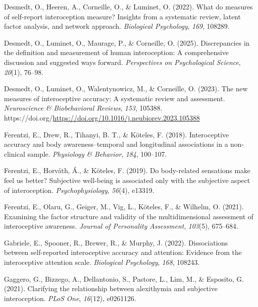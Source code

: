 \documentclass[
  jou,
  floatsintext,
  longtable,
  nolmodern,
  notxfonts,
  notimes,
  colorlinks=true,linkcolor=blue,citecolor=blue,urlcolor=blue]{apa7}
\newlength{\cslhangindent}
\newenvironment{CSLReferences}[2] %
 {\begin{list}{}{%
  \setlength{\itemindent}{0pt}
  \setlength{\leftmargin}{0pt}
  \setlength{\parsep}{0pt}
  \ifodd #1
   \setlength{\leftmargin}{\cslhangindent}
   \setlength{\itemindent}{-1\cslhangindent}
  \fi
  \setlength{\itemsep}{#2\baselineskip}}}
 {\end{list}}
\begin{document}
\begin{CSLReferences}{1}{0}
Desmedt, O., Heeren, A., Corneille, O., \& Luminet, O. (2022). What do
measures of self-report interoception measure? Insights from a
systematic review, latent factor analysis, and network approach.
\emph{Biological Psychology}, \emph{169}, 108289.

Desmedt, O., Luminet, O., Maurage, P., \& Corneille, O. (2025).
Discrepancies in the definition and measurement of human interoception:
A comprehensive discussion and suggested ways forward.
\emph{Perspectives on Psychological Science}, \emph{20}(1), 76--98.

Desmedt, O., Luminet, O., Walentynowicz, M., \& Corneille, O. (2023).
The new measures of interoceptive accuracy: A systematic review and
assessment. \emph{Neuroscience \& Biobehavioral Reviews}, \emph{153},
105388.
https://doi.org/\url{https://doi.org/10.1016/j.neubiorev.2023.105388}

Ferentzi, E., Drew, R., Tihanyi, B. T., \& Köteles, F. (2018).
Interoceptive accuracy and body awareness--temporal and longitudinal
associations in a non-clinical sample. \emph{Physiology \& Behavior},
\emph{184}, 100--107.

Ferentzi, E., Horváth, Á., \& Köteles, F. (2019). Do body-related
sensations make feel us better? Subjective well-being is associated only
with the subjective aspect of interoception. \emph{Psychophysiology},
\emph{56}(4), e13319.

Ferentzi, E., Olaru, G., Geiger, M., Vig, L., Köteles, F., \& Wilhelm,
O. (2021). Examining the factor structure and validity of the
multidimensional assessment of interoceptive awareness. \emph{Journal of
Personality Assessment}, \emph{103}(5), 675--684.

Gabriele, E., Spooner, R., Brewer, R., \& Murphy, J. (2022).
Dissociations between self-reported interoceptive accuracy and
attention: Evidence from the interoceptive attention scale.
\emph{Biological Psychology}, \emph{168}, 108243.

Gaggero, G., Bizzego, A., Dellantonio, S., Pastore, L., Lim, M., \&
Esposito, G. (2021). Clarifying the relationship between alexithymia and
subjective interoception. \emph{PLoS One}, \emph{16}(12), e0261126.


\end{CSLReferences}
\end{document}
